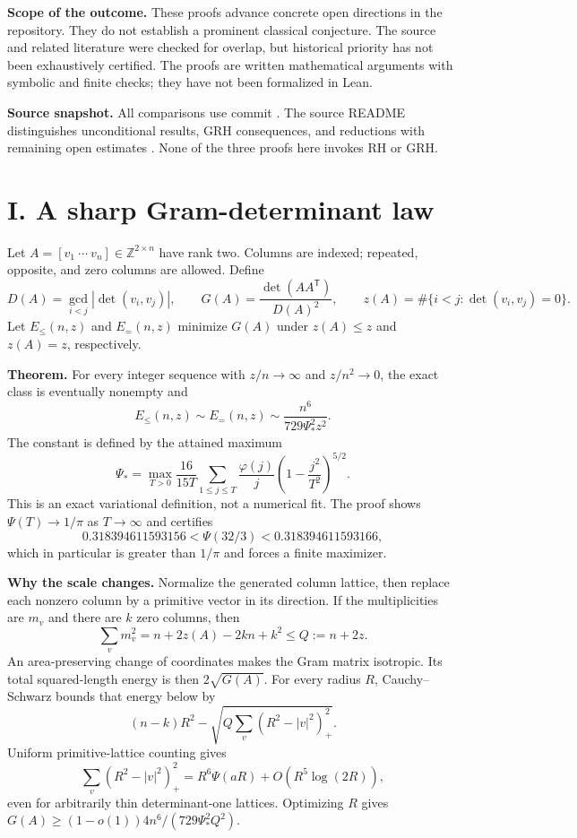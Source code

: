 \documentclass[11pt]{article}
\newcommand{\Z}{\mathbb Z}
\newcommand{\PsiStar}{\Psi_*}
\newcommand{\guideheading}[1]{\section*{\color{ink}#1}\addcontentsline{toc}{section}{#1}}
\begin{document}
\textbf{Scope of the outcome.}
These proofs advance concrete open directions in the repository. They do not
establish a prominent classical conjecture. The source and related literature
were checked for overlap, but historical priority has not been exhaustively
certified. The proofs are written mathematical arguments with symbolic and
finite checks; they have not been formalized in Lean.

\textbf{Source snapshot.}
All comparisons use commit
.
The source README distinguishes unconditional results, GRH consequences, and
reductions with remaining open estimates \cite{repo}. None of the three proofs
here invokes RH or GRH.

\newpage
\guideheading{I. A sharp Gram-determinant law}
Let $A=[v_1\ \cdots\ v_n]\in\Z^{2\times n}$ have rank two. Columns are indexed;
repeated, opposite, and zero columns are allowed. Define
\[
 D(A)=\gcd_{i<j}|\det(v_i,v_j)|,\qquad
 G(A)=\frac{\det(AA^{\mathsf T})}{D(A)^2},
 \qquad
 z(A)=\#\{i<j:\det(v_i,v_j)=0\}.
\]
Let $E_{\le}(n,z)$ and $E_{=}(n,z)$ minimize $G(A)$ under $z(A)\le z$ and
$z(A)=z$, respectively.

\textbf{Theorem.}
For every integer sequence with $z/n\to\infty$ and $z/n^2\to0$, the exact class
is eventually nonempty and
\[
 \boxed{E_{\le}(n,z)\sim E_{=}(n,z)
 \sim\frac{n^6}{729\PsiStar^2z^2}.}
\]
The constant is defined by the attained maximum
\[
 \PsiStar=\max_{T>0}
 \frac{16}{15T}\sum_{1\le j\le T}\frac{\varphi(j)}j
 \left(1-\frac{j^2}{T^2}\right)^{5/2}.
\]
This is an exact variational definition, not a numerical fit. The proof shows
$\Psi(T)\to1/\pi$ as $T\to\infty$ and certifies
\[
 0.318394611593156<\Psi(32/3)<0.318394611593166,
\]
which in particular is greater than $1/\pi$ and forces a finite maximizer.

\textbf{Why the scale changes.}
Normalize the generated column lattice, then replace each nonzero column by a
primitive vector in its direction. If the multiplicities are $m_v$ and there
are $k$ zero columns, then
\[
 \sum_v m_v^2=n+2z(A)-2kn+k^2\le Q:=n+2z.
\]
An area-preserving change of coordinates makes the Gram matrix isotropic.
Its total squared-length energy is then $2\sqrt{G(A)}$. For every radius $R$,
Cauchy--Schwarz bounds that energy below by
\[
 (n-k)R^2-
 \sqrt{Q\sum_v(R^2-|v|^2)_+^2}.
\]
Uniform primitive-lattice counting gives
\[
 \sum_v(R^2-|v|^2)_+^2
 =R^6\Psi(aR)+O(R^5\log(2R)),
\]
even for arbitrarily thin determinant-one lattices. Optimizing $R$ gives
$G(A)\ge(1-o(1))4n^6/(729\PsiStar^2Q^2)$.
\end{document}

